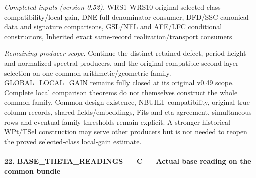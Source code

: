 \documentclass[11pt,a4paper]{article}
\numberwithin{equation}{section}
\theoremstyle{remark}\newtheorem{remark}[theorem]{Remark}
\begin{document}
\emph{Completed inputs (version 0.52).} WRS1-WRS10 original selected-class compatibility/local gain, DNE full denominator consumer, DFD/SSC canonical-data and signature comparisons, GSL/NFL and AFE/LFC conditional constructors, Inherited exact same-record realization/transport consumers

\emph{Remaining producer scope.} Continue the distinct retained-defect, period-height and normalized spectral producers, and the original compatible second-layer selection on one common arithmetic/geometric family. GLOBAL\_\allowbreak LOCAL\_\allowbreak GAIN remains fully closed at its original v0.49 scope. Complete local comparison theorems do not themselves construct the whole common family. Common design existence, NBUILT compatibility, original true-column records, shared fields/embeddings, Fits and eta agreement, simultaneous rows and eventual-family thresholds remain explicit. A stronger historical WPt/TSel construction may serve other producers but is not needed to reopen the proved selected-class local-gain estimate.



\paragraph{22. BASE\_\allowbreak THETA\_\allowbreak READINGS — C — Actual base reading on the common bundle}
\end{document}
